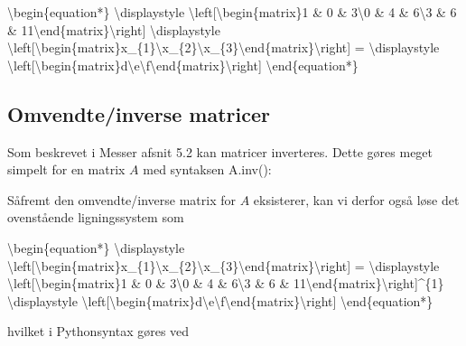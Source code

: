 \documentclass[letterpaper,10pt,english]{jupyterBook}
\begin{document}
\textbackslash{}begin\{equation*\}
\textbackslash{}displaystyle \textbackslash{}left{[}\textbackslash{}begin\{matrix\}1 \& 0 \& 3\textbackslash{}0 \& 4 \& 6\textbackslash{}3 \& 6 \& 11\textbackslash{}end\{matrix\}\textbackslash{}right{]} \textbackslash{}displaystyle \textbackslash{}left{[}\textbackslash{}begin\{matrix\}x\_\{1\}\textbackslash{}x\_\{2\}\textbackslash{}x\_\{3\}\textbackslash{}end\{matrix\}\textbackslash{}right{]} = \textbackslash{}displaystyle \textbackslash{}left{[}\textbackslash{}begin\{matrix\}d\textbackslash{}e\textbackslash{}f\textbackslash{}end\{matrix\}\textbackslash{}right{]}
\textbackslash{}end\{equation*\}


\subsection{Omvendte/inverse matricer}
\label{\detokenize{notebooks/sympy/Notebook_LinAlg1_5:omvendte-inverse-matricer}}
Som beskrevet i Messer afsnit 5.2 kan matricer inverteres. Dette gøres meget simpelt for en matrix \(A\) med syntaksen A.inv():

\begin{sphinxVerbatim}[commandchars=\\\{\}]
\end{sphinxVerbatim}

\noindent{}

Såfremt den omvendte/inverse matrix for \(A\) eksisterer, kan vi derfor også løse det ovenstående ligningssystem som

\textbackslash{}begin\{equation*\}
\textbackslash{}displaystyle \textbackslash{}left{[}\textbackslash{}begin\{matrix\}x\_\{1\}\textbackslash{}x\_\{2\}\textbackslash{}x\_\{3\}\textbackslash{}end\{matrix\}\textbackslash{}right{]} =
\textbackslash{}displaystyle \textbackslash{}left{[}\textbackslash{}begin\{matrix\}1 \& 0 \& 3\textbackslash{}0 \& 4 \& 6\textbackslash{}3 \& 6 \& 11\textbackslash{}end\{matrix\}\textbackslash{}right{]}\textasciicircum{}\{\sphinxhyphen{}1\}
\textbackslash{}displaystyle \textbackslash{}left{[}\textbackslash{}begin\{matrix\}d\textbackslash{}e\textbackslash{}f\textbackslash{}end\{matrix\}\textbackslash{}right{]}
\textbackslash{}end\{equation*\}

hvilket i Python\sphinxhyphen{}syntax gøres ved

\begin{sphinxVerbatim}[commandchars=\\\{\}]
\end{sphinxVerbatim}
\end{document}
